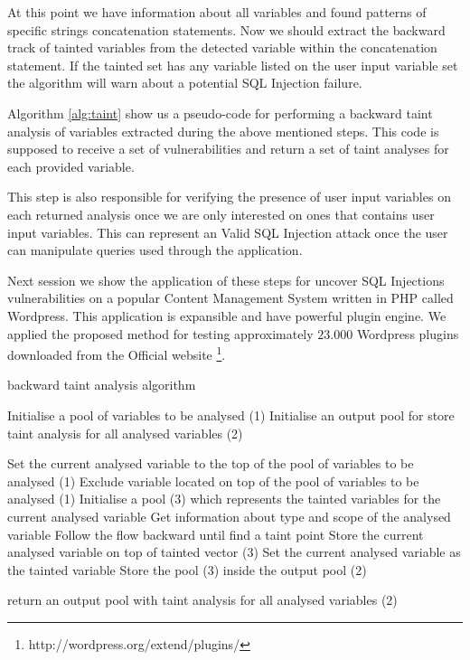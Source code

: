 At this point we have information about all variables and found patterns of specific strings concatenation statements. Now we should extract the backward track of tainted variables from the detected variable within the concatenation statement. If the tainted set has any variable listed on the user input variable set the algorithm will warn about a potential SQL Injection failure.

Algorithm \ref{alg:taint} show us a pseudo-code for performing a backward taint analysis of variables extracted during the above mentioned steps. This code is supposed to receive a set of vulnerabilities and return a set of taint analyses for each provided variable. 

This step is also responsible for verifying the presence of user input variables on each returned analysis once we are only interested on ones that contains user input variables. This can represent an Valid SQL Injection attack once the user can manipulate queries used through the application.

Next session we show the application of these steps for uncover SQL Injections vulnerabilities on a popular Content Management System written in PHP called Wordpress. This application is expansible and have powerful plugin engine. We applied the proposed method for testing approximately $23.000$ Wordpress plugins downloaded from the Official website \footnote{http://wordpress.org/extend/plugins/}.

\begin{algorithm}
\caption{backward taint analysis algorithm}
\label{alg:taint}

\begin{algorithmic}
\STATE Initialise a pool of variables to be analysed (1)
\STATE Initialise an output pool for store taint analysis for all analysed variables (2)

\REPEAT
  \STATE Set the current analysed variable to the top of the pool of variables to be analysed (1)
  \STATE Exclude variable located on top of the pool of variables to be analysed (1)
  \STATE Initialise a pool (3) which represents the tainted variables for the current analysed variable
  \REPEAT
    \STATE Get information about type and scope of the analysed variable
    \STATE Follow the flow backward until find a taint point
      \STATE Store the current analysed variable on top of tainted vector (3)
      \STATE Set the current analysed variable as the tainted variable
    \ENDIF
  \STATE Store the pool (3) inside the output pool (2)

\STATE return an output pool with taint analysis for all analysed variables (2) 
\end{algorithmic}
\end{algorithm}


